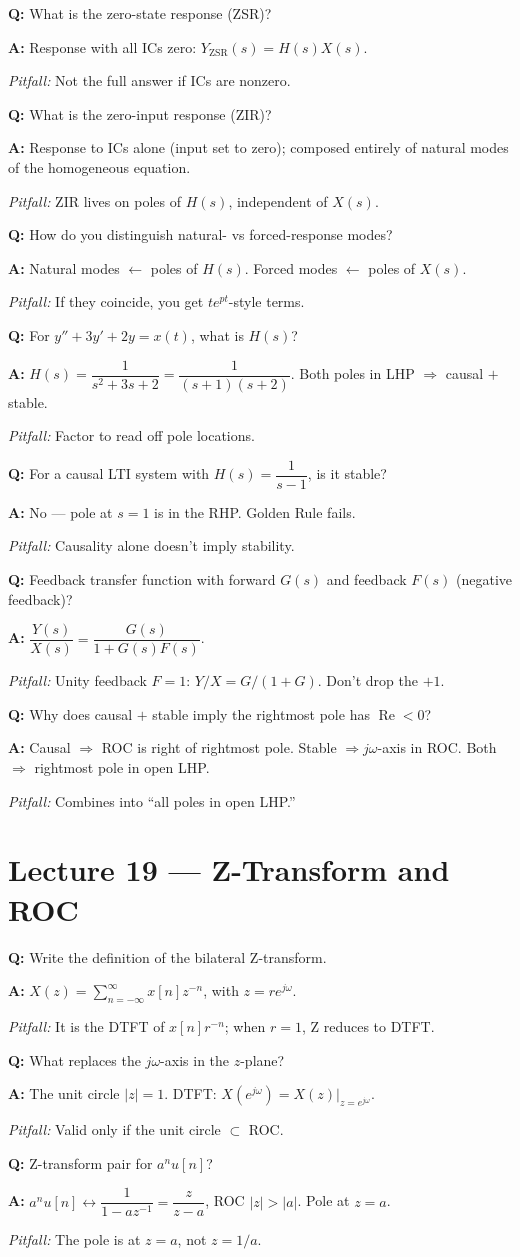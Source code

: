 \documentclass[11pt]{article}
\newcommand{\Q}[1]{\par\medskip\noindent\textbf{Q:} #1}
\newcommand{\A}[1]{\par\noindent\textbf{A:} #1}
\newcommand{\Pit}[1]{\par\noindent\textit{Pitfall:} #1}
\begin{document}
\Q{What is the zero-state response (ZSR)?}
\A{Response with all ICs zero: $Y_{\text{ZSR}}(s) = H(s)X(s)$.}
\Pit{Not the full answer if ICs are nonzero.}

\Q{What is the zero-input response (ZIR)?}
\A{Response to ICs alone (input set to zero); composed entirely of natural modes of the homogeneous equation.}
\Pit{ZIR lives on poles of $H(s)$, independent of $X(s)$.}

\Q{How do you distinguish natural- vs forced-response modes?}
\A{Natural modes $\leftarrow$ poles of $H(s)$. Forced modes $\leftarrow$ poles of $X(s)$.}
\Pit{If they coincide, you get $t e^{pt}$-style terms.}

\Q{For $y'' + 3y' + 2y = x(t)$, what is $H(s)$?}
\A{$H(s) = \dfrac{1}{s^2+3s+2} = \dfrac{1}{(s+1)(s+2)}$. Both poles in LHP $\Rightarrow$ causal $+$ stable.}
\Pit{Factor to read off pole locations.}

\Q{For a causal LTI system with $H(s) = \dfrac{1}{s-1}$, is it stable?}
\A{No --- pole at $s=1$ is in the RHP. Golden Rule fails.}
\Pit{Causality alone doesn't imply stability.}

\Q{Feedback transfer function with forward $G(s)$ and feedback $F(s)$ (negative feedback)?}
\A{$\dfrac{Y(s)}{X(s)} = \dfrac{G(s)}{1+G(s)F(s)}$.}
\Pit{Unity feedback $F=1$: $Y/X = G/(1+G)$. Don't drop the $+1$.}

\Q{Why does causal $+$ stable imply the rightmost pole has $\operatorname{Re}<0$?}
\A{Causal $\Rightarrow$ ROC is right of rightmost pole. Stable $\Rightarrow j\omega$-axis in ROC. Both $\Rightarrow$ rightmost pole in open LHP.}
\Pit{Combines into ``all poles in open LHP.''}

\section{Lecture 19 --- Z-Transform and ROC}

\Q{Write the definition of the bilateral Z-transform.}
\A{$X(z) = \displaystyle\sum_{n=-\infty}^{\infty} x[n]z^{-n}$, with $z = re^{j\omega}$.}
\Pit{It is the DTFT of $x[n]r^{-n}$; when $r=1$, Z reduces to DTFT.}

\Q{What replaces the $j\omega$-axis in the $z$-plane?}
\A{The unit circle $|z|=1$. DTFT: $X(e^{j\omega}) = X(z)\big|_{z=e^{j\omega}}$.}
\Pit{Valid only if the unit circle $\subset$ ROC.}

\Q{Z-transform pair for $a^n u[n]$?}
\A{$a^n u[n] \leftrightarrow \dfrac{1}{1-az^{-1}} = \dfrac{z}{z-a}$, ROC $|z|>|a|$. Pole at $z=a$.}
\Pit{The pole is at $z=a$, not $z=1/a$.}
\end{document}
